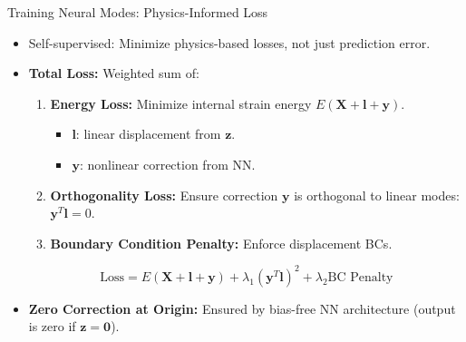 \documentclass{beamer}
\begin{document}
\begin{frame}{Training Neural Modes: Physics-Informed Loss}
    \begin{itemize}
        \item Self-supervised: Minimize physics-based losses, not just prediction error.
        \item \textbf{Total Loss:} Weighted sum of:
        \begin{enumerate}
            \item \textbf{Energy Loss:} Minimize internal strain energy \(E(\bm{X} + \bm{l} + \bm{y})\).
            \begin{itemize}
                \item \(\bm{l}\): linear displacement from \(\bm{z}\).
                \item \(\bm{y}\): nonlinear correction from NN.
            \end{itemize}
            \item \textbf{Orthogonality Loss:} Ensure correction \(\bm{y}\) is orthogonal to linear modes: \(\bm{y}^T \bm{l} = 0\).
            \item \textbf{Boundary Condition Penalty:} Enforce displacement BCs.
        \end{enumerate}
        \begin{equation*}
            \text{Loss} = E(\bm{X} + \bm{l} + \bm{y}) + \lambda_1 (\bm{y}^T \bm{l})^2 + \lambda_2 \text{BC Penalty}
        \end{equation*}
        \item \textbf{Zero Correction at Origin:} Ensured by bias-free NN architecture (output is zero if \(\bm{z}=\bm{0}\)).
    \end{itemize}
\end{frame}
\end{document}
